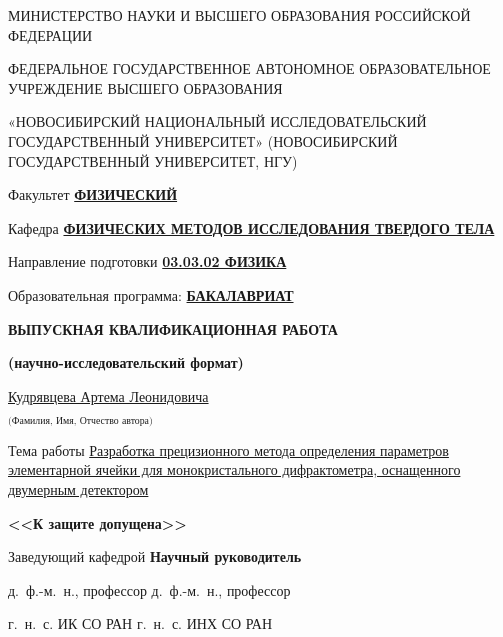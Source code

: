 \begin{titlepage}
\thispagestyle{empty}
\begin{spacing}{1.15}
\footnotesize
\begin{center}
    МИНИСТЕРСТВО НАУКИ И ВЫСШЕГО ОБРАЗОВАНИЯ РОССИЙСКОЙ ФЕДЕРАЦИИ
    \vspace{20pt}

    ФЕДЕРАЛЬНОЕ ГОСУДАРСТВЕННОЕ АВТОНОМНОЕ ОБРАЗОВАТЕЛЬНОЕ\\
    УЧРЕЖДЕНИЕ ВЫСШЕГО ОБРАЗОВАНИЯ
    \vspace{6pt}

    «НОВОСИБИРСКИЙ НАЦИОНАЛЬНЫЙ ИССЛЕДОВАТЕЛЬСКИЙ ГОСУДАРСТВЕННЫЙ УНИВЕРСИТЕТ» (НОВОСИБИРСКИЙ ГОСУДАРСТВЕННЫЙ УНИВЕРСИТЕТ, НГУ)
    \vspace{10pt}
\end{center}
Факультет \uline{\textbf{ФИЗИЧЕСКИЙ}}
\vspace{10pt}

\noindent
Кафедра \uline{\textbf{ФИЗИЧЕСКИХ МЕТОДОВ ИССЛЕДОВАНИЯ ТВЕРДОГО ТЕЛА}}
\vspace{8mm}

\noindent
Направление подготовки \uline{\textbf{03.03.02 ФИЗИКА}}
\vspace{10pt}

\noindent
Образовательная программа: \uline{\textbf{БАКАЛАВРИАТ}}
\vspace{8mm}
\begin{center}
    \textbf{ВЫПУСКНАЯ КВАЛИФИКАЦИОННАЯ РАБОТА}

    \textbf{(научно-исследовательский формат)}
    \vspace{8mm}

    \uline{\hfill Кудрявцева Артема Леонидовича \hfill}

    $_\text{(Фамилия, Имя, Отчество автора)}$
    \vspace{8mm}
\end{center}
Тема работы \uline{Разработка прецизионного метода определения параметров элементарной ячейки для монокристального дифрактометра, оснащенного двумерным детектором \hfill}
\vfill

\noindent
\textbf{<<К защите допущена>>}

\noindent
Заведующий кафедрой \hfill \textbf{Научный руководитель}
\vspace{10pt}

\noindent
д.~ф.-м.~н., профессор \hfill д.~ф.-м.~н., профессор
\vspace{10pt}

\noindent
г.~н.~с. ИК СО РАН \hfill г.~н.~с. ИНХ СО РАН
\vspace{10pt}


\end{spacing}
\end{titlepage}
